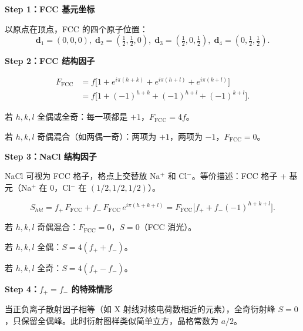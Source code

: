\begin{derivationbox}
\textbf{Step 1：FCC 基元坐标}

以原点在顶点，FCC 的四个原子位置：
\[
\mathbf{d}_1=(0,0,0),\;\mathbf{d}_2=(\tfrac{1}{2},\tfrac{1}{2},0),\;
\mathbf{d}_3=(\tfrac{1}{2},0,\tfrac{1}{2}),\;\mathbf{d}_4=(0,\tfrac{1}{2},\tfrac{1}{2}).
\]

\textbf{Step 2：FCC 结构因子}

\begin{align*}
F_{\text{FCC}}&=f\bigl[1+e^{i\pi(h+k)}+e^{i\pi(h+l)}+e^{i\pi(k+l)}\bigr]\\
&=f\bigl[1+(-1)^{h+k}+(-1)^{h+l}+(-1)^{k+l}\bigr].
\end{align*}

若 $h,k,l$ 全偶或全奇：每一项都是 $+1$，$F_{\text{FCC}}=4f$。

若 $h,k,l$ 奇偶混合（如两偶一奇）：两项为 $+1$，两项为 $-1$，$F_{\text{FCC}}=0$。

\textbf{Step 3：NaCl 结构因子}

NaCl 可视为 FCC 格子，格点上交替放 Na$^+$ 和 Cl$^-$。等价描述：FCC 格子 + 基元（Na$^+$ 在 0，Cl$^-$ 在 $(1/2,1/2,1/2)$）。

\[
S_{hkl}=f_+\,F_{\text{FCC}}+f_-\,F_{\text{FCC}}\,e^{i\pi(h+k+l)}
=F_{\text{FCC}}\bigl[f_++f_-(-1)^{h+k+l}\bigr].
\]

若 $h,k,l$ 奇偶混合：$F_{\text{FCC}}=0$，$S=0$（FCC 消光）。

若 $h,k,l$ 全偶：$S=4(f_++f_-)$。

若 $h,k,l$ 全奇：$S=4(f_+-f_-)$。

\textbf{Step 4：$f_+=f_-$ 的特殊情形}

当正负离子散射因子相等（如 X 射线对核电荷数相近的元素），全奇衍射峰 $S=0$，只保留全偶峰。此时衍射图样类似简单立方，晶格常数为 $a/2$。
\end{derivationbox}

\vspace{1em}
